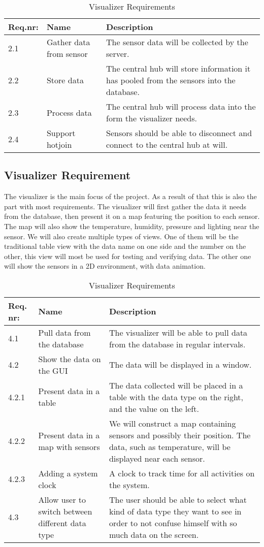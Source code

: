 \documentclass[../document]{subfiles}
\begin{document}
\begin{table}[H]
\caption{Visualizer Requirements}
\centering
\begin{tabularx}{\textwidth}{|l|X|X|}
\hline
Req.nr:
&Name
&Description
\\ \hline 2.1
&Gather data from sensor
&The sensor data will be collected by the server.
\\ \hline 2.2
&Store data
&The central hub will store information it has pooled from the sensors into the database.
\\ \hline 2.3
&Process data 
&The central hub will process data into the form the visualizer needs.
\\ \hline 2.4
&Support hotjoin
&Sensors should be able to disconnect and connect to the central hub at will.
\\ \hline 
\end{tabularx}
\end{table}

\subsection{Visualizer Requirement}
The visualizer is the main focus of the project. As a result of that this is also the part with most requirements. The visualizer will first gather the data it needs from the database, then present it on a map featuring the position to each sensor. The map will also show the temperature, humidity, pressure and lighting near the sensor. We will also create multiple types of views. One of them will be the traditional table view with the data name on one side and the number on the other, this view will most be used for testing and verifying data. The other one will show the sensors in a 2D environment, with data animation.

\begin{table}[H]
\caption{Visualizer Requirements}
\centering
\begin{tabularx}{\textwidth}{|l|X|X|}
\hline
Req. nr:
&Name
&Description
\\ \hline 4.1
&Pull data from the database
&The visualizer will be able to pull data from the database in regular intervals.
\\ \hline 4.2
&Show the data on the GUI
&The data will be displayed in a window.
\\ \hline 4.2.1
&Present data in a table
&The data collected will be placed in a table with the data type on the right, and the value on the left.
\\ \hline 4.2.2
&Present data in a map with sensors
&We will construct a map containing sensors and possibly their position. The data, such as temperature, will be displayed near each sensor.
\\ \hline 4.2.3
&Adding a system clock
&A clock to track time for all activities on the system.
\\ \hline 4.3
&Allow user to switch between different data type
&The user should be able to select what kind of data type they want to see in order to not confuse himself with so much data on the screen.
\\ \hline 
\end{tabularx}
\end{table}
\end{document}
